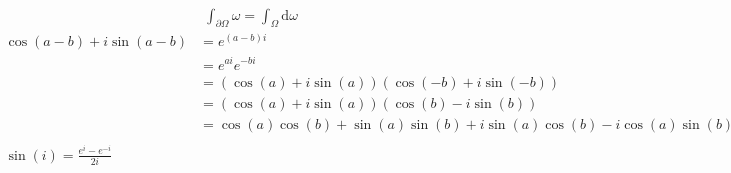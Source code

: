 \documentclass[a4paper,11pt]{article}
\theoremstyle{plain}
\theoremstyle{definition}
\newcommand{\dx}{\text{d}}
\newcommand{\del}{\partial}
\begin{document}
\begin{align*}
\end{align*}
\begin{align*}
	\int_{\del \Omega} \omega = \int_{\Omega} \dx \omega
\end{align*}
\begin{align*}
	\cos(a-b)+i\sin(a-b) &= e^{(a-b)i} \\
	&= e^{ai} e^{-bi} \\
	&= (\cos(a)+i\sin(a))(\cos(-b)+i\sin(-b)) \\
	&= (\cos(a)+i\sin(a))(\cos(b)-i\sin(b)) \\
	&= \cos(a)\cos(b)+\sin(a)\sin(b)+i\sin(a)\cos(b)-i\cos(a)\sin(b) \\
	\\
	\sin(i) = \frac{e^{i}-e^{-i}}{2i}
\end{align*}
\newpage
\end{document}
